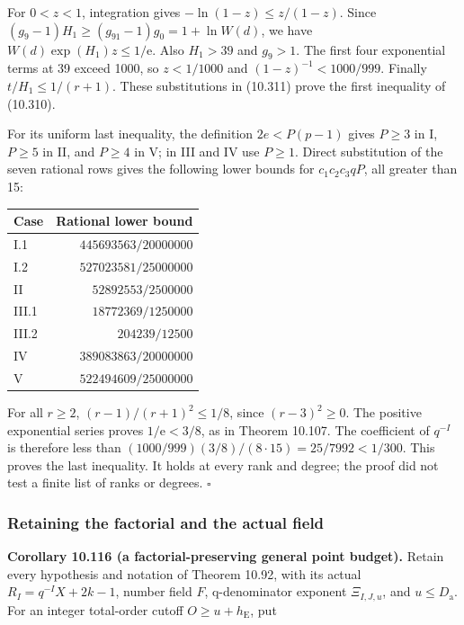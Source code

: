 \documentclass[
  11pt,
  a4paper,
]{article}
\newcounter{none} %
\begin{document}
For \(0<z<1\), integration gives \(-\ln(1-z)\le z/(1-z)\). Since
\((g_9-1)H_1\ge(g_{91}-1)g_0=1+\ln W(d)\), we have
\(W(d)\exp(H_1)z\le1/\mathrm e\). Also \(H_1>39\) and \(g_9>1\). The
first four exponential terms at 39 exceed 1000, so \(z<1/1000\) and
\((1-z)^{-1}<1000/999\). Finally \(t/H_1\le1/(r+1)\). These
substitutions in (10.311) prove the first inequality of (10.310).

For its uniform last inequality, the definition \(2e<P(p-1)\) gives
\(P\ge3\) in I, \(P\ge5\) in II, and \(P\ge4\) in V; in III and IV use
\(P\ge1\). Direct substitution of the seven rational rows gives the
following lower bounds for \(c_1c_2c_3qP\), all greater than 15:

{\def\LTcaptype{none} %
\begin{longtable}[]{@{}lr@{}}
\toprule\noalign{}
Case & Rational lower bound \\
\midrule\noalign{}
\endhead
\bottomrule\noalign{}
\endlastfoot
I.1 & \(445693563/20000000\) \\
I.2 & \(527023581/25000000\) \\
II & \(52892553/2500000\) \\
III.1 & \(18772369/1250000\) \\
III.2 & \(204239/12500\) \\
IV & \(389083863/20000000\) \\
V & \(522494609/25000000\) \\
\end{longtable}
}

For all \(r\ge2\), \((r-1)/(r+1)^2\le1/8\), since \((r-3)^2\ge0\). The
positive exponential series proves \(1/\mathrm e<3/8\), as in Theorem
10.107. The coefficient of \(q^{-I}\) is therefore less than
\((1000/999)(3/8)/(8\cdot15)=25/7992<1/300\). This proves the last
inequality. It holds at every rank and degree; the proof did not test a
finite list of ranks or degrees. \(\square\)

\subsubsection{Retaining the factorial and the actual
field}\label{retaining-the-factorial-and-the-actual-field}

\textbf{Corollary 10.116 (a factorial-preserving general point budget).}
Retain every hypothesis and notation of Theorem 10.92, with its actual
\(R_I=q^{-I}X+2k-1\), number field \(F\), q-denominator exponent
\(\Xi_{I,J,u}\), and \(u\le D_{\mathrm a}\). For an integer total-order
cutoff \(O\ge u+h_{\mathrm E}\), put
\end{document}
